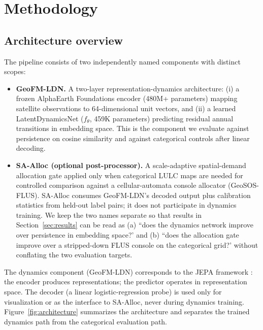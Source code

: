 \documentclass{article}
\begin{document}
\section{Methodology}
\label{sec:method}

\subsection{Architecture overview}

The pipeline consists of two independently named components with distinct scopes:

\begin{itemize}
\item \textbf{GeoFM-LDN.} A two-layer representation-dynamics architecture: (i) a frozen AlphaEarth Foundations encoder (480M+ parameters) mapping satellite observations to 64-dimensional unit vectors, and (ii) a learned LatentDynamicsNet ($f_\theta$, 459K parameters) predicting residual annual transitions in embedding space. This is the component we evaluate against persistence on cosine similarity and against categorical controls after linear decoding.
\item \textbf{SA-Alloc (optional post-processor).} A scale-adaptive spatial-demand allocation gate applied only when categorical LULC maps are needed for controlled comparison against a cellular-automata console allocator (GeoSOS-FLUS). SA-Alloc consumes GeoFM-LDN's decoded output plus calibration statistics from held-out label pairs; it does not participate in dynamics training. We keep the two names separate so that results in Section~\ref{sec:results} can be read as (a) ``does the dynamics network improve over persistence in embedding space?' and (b) ``does the allocation gate improve over a stripped-down FLUS console on the categorical grid?' without conflating the two evaluation targets.
\end{itemize}

The dynamics component (GeoFM-LDN) corresponds to the JEPA framework \citep{lecun2022jepa}: the encoder produces representations; the predictor operates in representation space. The decoder (a linear logistic-regression probe) is used only for visualization or as the interface to SA-Alloc, never during dynamics training. Figure~\ref{fig:architecture} summarizes the architecture and separates the trained dynamics path from the categorical evaluation path.
\end{document}
